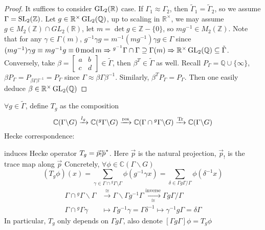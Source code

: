 \documentclass[main]{subfiles}
\begin{document}
\begin{proof}
It suffices to consider $\operatorname{GL}_2(\mathbb R)$ case. If $\Gamma_1\approx\Gamma_2$, then $\tilde\Gamma_1=\tilde\Gamma_2$, so we assume $\Gamma=\operatorname{SL}_2(\mathbb Z)$. Let $g\in\mathbb R^\times\operatorname{GL}_2(\mathbb Q)$, up to scaling in $\mathbb R^\times$, we may assume $g\in M_2(\mathbb Z)\cap GL_2(\mathbb R)$, let $m=\det g\in\mathbb Z-\{0\}$, so $mg^{-1}\in M_2(\mathbb Z)$. Note that for any $\gamma\in\Gamma(m)$, $g^{-1}\gamma g=m^{-1}(mg^{-1})\gamma g\in\Gamma$ since $(mg^{-1})\gamma g\equiv mg^{-1}g\equiv0\,\mathrm{mod}\, m\Rightarrow {^{g^{-1}}\Gamma}\cap\Gamma\supseteq\Gamma(m)\Rightarrow\mathbb R^\times\operatorname{GL}_2(\mathbb Q)\subseteq\tilde\Gamma$. Conversely, take $\beta=\begin{bmatrix}
a&b\\
c&d
\end{bmatrix}\in\tilde\Gamma$, then $\beta^T\in\tilde\Gamma$ as well. Recall $P_\Gamma=\mathbb Q\cup\{\infty\}$, $\beta P_\Gamma=P_{\beta\Gamma\beta^{-1}}=P_\Gamma$ since $\Gamma\approx\beta\Gamma\beta^{-1}$. Similarly, $\beta^TP_\Gamma=P_\Gamma$. Then one easily deduce $\beta\in\mathbb R^\times\operatorname{GL}_2(\mathbb Q)$
\end{proof}

\begin{definition}
$\forall g\in\tilde\Gamma$, define $T_g$ as the composition
\[\mathbb C(\Gamma\backslash G)\xrightarrow{l_g}\mathbb C({^g\Gamma}\backslash G)\xrightarrow{\operatorname{res}}\mathbb C(\Gamma\cap{^g\Gamma}\backslash G)\xrightarrow{\operatorname{Tr}}\mathbb C(\Gamma\backslash G)\]
Hecke correspondence:
\begin{center}
\end{center}
induces Hecke operator $T_g=\vec p_!\cev p^*$. Here $\vec p$ is the natural projection, $\vec p_!$ is the trace map along $\vec p$
Concretely, $\forall \phi\in\mathbb C(\Gamma\backslash G)$
\[(T_g\phi)(x)=\sum_{\gamma\in\Gamma\cap{^g\Gamma}\setminus\Gamma}\phi(g^{-1}\gamma x)=\sum_{\delta\in\Gamma g\Gamma/\Gamma}\phi(\delta^{-1}x)\]
\begin{align*}
\Gamma\cap{^g\Gamma}\backslash\Gamma&\xrightarrow{\cong}\Gamma\backslash\Gamma g^{-1}\Gamma\xrightarrow[\cong]{\text{inverse}}\Gamma g\Gamma/\Gamma \\
\Gamma\cap{^g\Gamma}\gamma&\mapsto\Gamma g^{-1}\gamma=\Gamma\delta^{-1}\mapsto\gamma^{-1}g\Gamma=\delta\Gamma
\end{align*}
In particular, $T_g$ only depends on $\Gamma g\Gamma$, also denote $[\Gamma g\Gamma]\phi=T_g\phi$
\end{definition}
\end{document}
